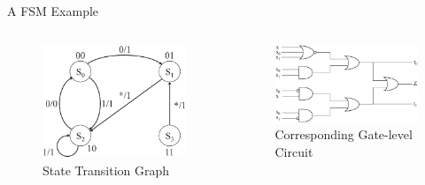 \documentclass[xcolor=dvipsnames]{beamer}
\begin{document}
\begin{frame}{\large{A FSM Example}}
\begin{columns}

\begin{column}{0.3\textwidth}

\begin{figure}[hbt]
\centerline{
\includegraphics[scale=0.25]{stg_fig.ps}
}
\caption{State Transition Graph}
\end{figure}

\end{column}

\begin{column}{0.3\textwidth}
\begin{figure}[hbt]
\centerline{
\includegraphics[scale=0.2]{fsm_fig.eps}
}
\caption{Corresponding Gate-level Circuit}
\end{figure}
\end{column}

\end{columns}
\end{frame}
\end{document}
